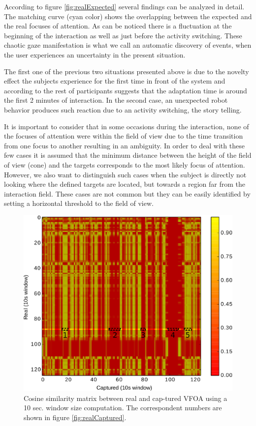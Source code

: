 \documentclass{sig-alternate}
\begin{document}
According to figure \ref{fig:realExpected} several findings can be analyzed in
detail. The matching curve (cyan color) shows the overlapping between the
expected and the real focuses of attention. As can be noticed there is a
fluctuation at the beginning of the interaction as well as just before the
activity switching. These chaotic gaze manifestation is what we call an
automatic discovery of events, when the user experiences an uncertainty in the
present situation. 

The first one of the previous two situations presented above is due to the
novelty effect the subjects experience for the first time in front of the system
and according to the rest of participants suggests that the adaptation time is
around the first 2 minutes of interaction. In the second case, an unexpected
robot behavior produces such reaction due to an activity switching, the story
telling.

It is important to consider that in some occasions during the interaction, none
of the focuses of attention were within the field of view due to the time
transition from one focus to another resulting in an ambiguity. In order to deal
with these few cases it is assumed that the minimum distance between the height
of the field of view (cone) and the targets corresponds to the most likely focus
of attention. However, we also want to distinguish such cases when the subject
is directly not looking where the defined targets are located, but towards a
region far from the interaction field. These cases are not common but they can
be easily identified by setting a horizontal threshold to the field of view.

\begin{figure}[h!]
    \centering
    \includegraphics[width=0.7\columnwidth]{bitmap}
    \caption{\small Cosine similarity matrix between real and cap-tured VFOA
    using a 10 sec. window size computation. The correspondent numbers are shown
    in figure \ref{fig:realCaptured}.}
    \label{fig:bitmap}
\end{figure}
\end{document}

